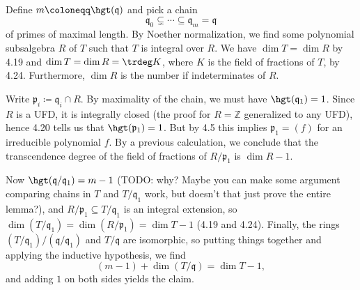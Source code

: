 Define $m\coloneqq \hgt(\mathfrak{q})$ and pick a chain
\[ \mathfrak{q}_0 \subsetneq \cdots\subseteq \mathfrak{q}_m = \mathfrak{q} \]
of primes of maximal length. By Noether normalization, we find some polynomial
subsalgebra $R$ of $T$ such that $T$ is integral over $R$. We have
$\dim T = \dim R$ by 4.19 and $\dim T = \dim R = \trdeg K$, where $K$ is the
field of fractions of $T$, by 4.24. Furthermore, $\dim R$ is the number
if indeterminates of $R$.

Write $\mathfrak{p}_i \coloneqq \mathfrak{q}_i\cap R$. By maximality of the chain,
we must have $\hgt(\mathfrak{q}_1) = 1$. Since $R$ is a UFD, it is integrally
closed (the proof for $R = \mathbb{Z}$ generalized to any UFD), hence 4.20 tells
us that $\hgt(\mathfrak{p}_1) = 1$. But by 4.5 this implies $\mathfrak{p}_1 = (f)$
for an irreducible polynomial $f$. By a previous calculation, we conclude
that the transcendence degree of the field of fractions of  $R/\mathfrak{p}_1$ is
$\dim R - 1$.

Now $\hgt(\mathfrak{q}/\mathfrak{q}_1) = m - 1$ (TODO: why? Maybe you can make
some argument comparing chains in $T$ and $T/\mathfrak{q}_1$ work, but doesn't
that just prove the entire lemma?), and $R/\mathfrak{p}_1 \subseteq T/\mathfrak{q}_1$ is
an integral extension, so $\dim(T/\mathfrak{q}_1) = \dim(R/\mathfrak{p}_1) = \dim T-1$
(4.19 and 4.24). Finally, the rings $(T/\mathfrak{q}_1)/(\mathfrak{q}/\mathfrak{q}_1)$
and $T/\mathfrak{q}$ are isomorphic, so putting things together and applying the
inductive hypothesis, we find
\[ (m-1) + \dim(T/\mathfrak{q}) = \dim T - 1, \]
and adding $1$ on both sides yields the claim.
